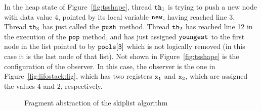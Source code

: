 In the heap state of Figure~\ref{fig:tsshape},
thread ${\tt th}_1$ is trying to push a new node with data value $4$, pointed by its local variable $\tt new$, having reached line 3.
Thread ${\tt th}_3$ has just called the ${\tt push}$ method.
Thread ${\tt th}_2$ has reached line 12 in the execution of the ${\tt pop}$ method,  and has just assigned ${\tt youngest}$ to the first node in the list
pointed to by $\tt pools[3]$ which is not logically removed (in this case it is the last node of that list).
Not shown in Figure~\ref{fig:tsshape} is the configuration of the
observer.
In this case, the
observer is the one in Figure~\ref{fig:lifostack:fig}, which has two registers
$\tt x_1$ and $\tt x_2$, which are assigned the values $4$ and $2$,
respectively.

\begin{figure}
\center  
   
 \caption{Fragment abstraction of the skiplist algorithm}
\label{sl-abs}
\end{figure}


